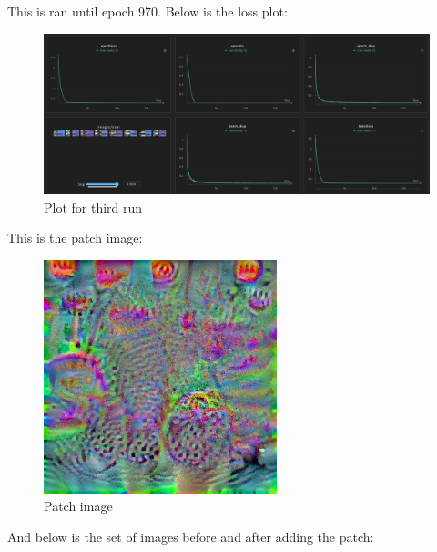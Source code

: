 \documentclass[conference]{IEEEtran}
\begin{document}
This is ran until epoch 970. Below is the loss plot:
\begin{figure}[!h]
    \centering
    \includegraphics[scale=0.15]{./images/results/run3.png}
    \caption{Plot for third run}
  \end{figure} 


  This is the patch image:

  \begin{figure}[!h]
    \centering
    \includegraphics[scale=0.5]{./images/results/epoch_970_patch.png}
    \caption{Patch image}
  \end{figure}
  And below is the set of images before and after adding the patch:
\end{document}
